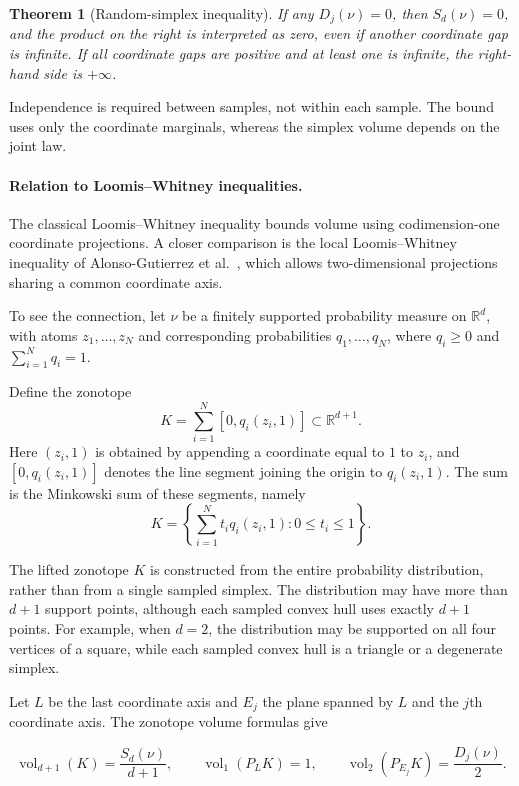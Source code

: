 \documentclass[11pt]{article}
\newtheorem{theorem}{Theorem}[section]
\theoremstyle{remark}
\newcommand{\R}{\mathbb{R}}
\newcommand{\vol}{\operatorname{vol}}
\begin{document}
\begin{humanblock}
\begin{theorem}[Random-simplex inequality]
If any $D_j(\nu)=0$, then $S_d(\nu)=0$, and the product on the right is interpreted as zero, even if another coordinate gap is infinite. If all coordinate gaps are positive and at least one is infinite, the right-hand side is $+\infty$.


\end{theorem}

Independence is required between samples, not within each sample. The bound uses only the coordinate marginals, whereas the simplex volume depends on the joint law.


\paragraph{Relation to Loomis--Whitney inequalities.}

The classical Loomis--Whitney inequality bounds volume using codimension-one coordinate projections. A closer comparison is the local Loomis--Whitney inequality of Alonso-Gutierrez et al.~\cite[Theorem 4.5]{AG}, which allows two-dimensional projections sharing a common coordinate axis.

To see the connection, let $\nu$ be a finitely supported probability measure on $\R^d$, with atoms $z_1,\ldots,z_N$ and corresponding probabilities $q_1,\ldots,q_N$, where $q_i\geq0$ and $\sum_{i=1}^N q_i=1$.

Define the zonotope
$$
K=\sum_{i=1}^N[0,q_i(z_i,1)]\subset\R^{d+1}.
$$
Here $(z_i,1)$ is obtained by appending a coordinate equal to $1$ to $z_i$, and $[0,q_i(z_i,1)]$ denotes the line segment joining the origin to $q_i(z_i,1)$. The sum is the Minkowski sum of these segments, namely
$$
K=\left\{\sum_{i=1}^N t_iq_i(z_i,1):0\leq t_i\leq1\right\}.
$$



The lifted zonotope $K$ is constructed from the entire probability distribution, rather than from a single sampled simplex. The distribution may have more than $d+1$ support points, although each sampled convex hull uses exactly $d+1$ points. For example, when $d=2$, the distribution may be supported on all four vertices of a square, while each sampled convex hull is a triangle or a degenerate simplex.





Let $L$ be the last coordinate axis and $E_j$ the plane spanned by $L$ and the $j$th coordinate axis. The zonotope volume formulas give

$$
\vol_{d+1}(K)=\frac{S_d(\nu)}{d+1},
\qquad
\vol_1(P_LK)=1,
\qquad
\vol_2(P_{E_j}K)=\frac{D_j(\nu)}{2}.
$$


\end{humanblock}
\end{document}
